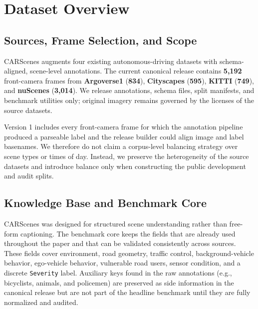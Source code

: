 \section{Dataset Overview}
\label{sec:dataset}

\subsection{Sources, Frame Selection, and Scope}
CARScenes augments four existing autonomous-driving datasets with schema-aligned, scene-level annotations. The current canonical release contains \textbf{5,192} front-camera frames from \textbf{Argoverse1} (\textbf{834}), \textbf{Cityscapes} (\textbf{595}), \textbf{KITTI} (\textbf{749}), and \textbf{nuScenes} (\textbf{3,014}). We release annotations, schema files, split manifests, and benchmark utilities only; original imagery remains governed by the licenses of the source datasets.

Version 1 includes every front-camera frame for which the annotation pipeline produced a parseable label and the release builder could align image and label basenames. We therefore do not claim a corpus-level balancing strategy over scene types or times of day. Instead, we preserve the heterogeneity of the source datasets and introduce balance only when constructing the public development and audit splits.

\subsection{Knowledge Base and Benchmark Core}
\label{sec:schema}

CARScenes was designed for structured scene understanding rather than free-form captioning. The benchmark core keeps the fields that are already used throughout the paper and that can be validated consistently across sources. These fields cover environment, road geometry, traffic control, background-vehicle behavior, ego-vehicle behavior, vulnerable road users, sensor condition, and a discrete \texttt{Severity} label. Auxiliary keys found in the raw annotations (e.g., bicyclists, animals, and policemen) are preserved as side information in the canonical release but are not part of the headline benchmark until they are fully normalized and audited.

